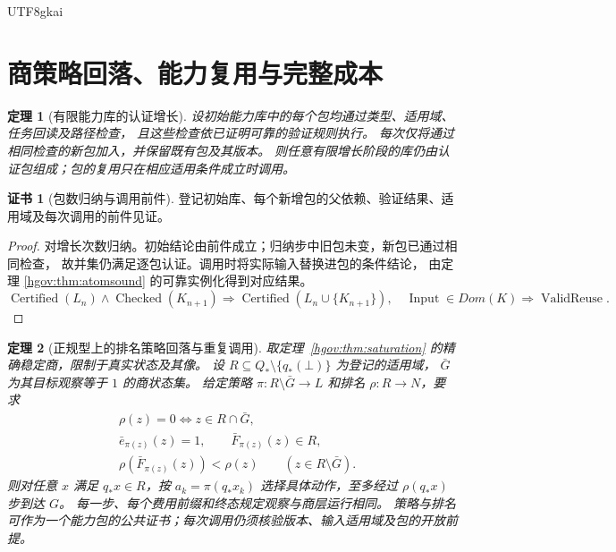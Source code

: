 \documentclass[12pt,a4paper,openany,notitlepage]{report}
\theoremstyle{plain}
\newtheorem{theorem}{定理}[chapter]
\theoremstyle{definition}
\newtheorem*{certificate}{证书}
\theoremstyle{remark}
\def\mathcal#1{#1}\def\mathsf#1{#1}\def\mathbb#1{#1}%
\begin{document}
\begin{CJK*}{UTF8}{gkai}
\section{商策略回落、能力复用与完整成本}
\label{exp:gov:reuse-section}

\begin{theorem}[有限能力库的认证增长]
\label{hgov:thm:library}
设初始能力库中的每个包均通过类型、适用域、任务回读及路径检查，
且这些检查依已证明可靠的验证规则执行。
每次仅将通过相同检查的新包加入，并保留既有包及其版本。
则任意有限增长阶段的库仍由认证包组成；包的复用只在相应适用条件成立时调用。
\end{theorem}
\begin{certificate}[包数归纳与调用前件]
登记初始库、每个新增包的父依赖、验证结果、适用域及每次调用的前件见证。
\end{certificate}
\begin{proof}
对增长次数归纳。初始结论由前件成立；归纳步中旧包未变，新包已通过相同检查，
故并集仍满足逐包认证。调用时将实际输入替换进包的条件结论，
由定理 \ref{hgov:thm:atomsound} 的可靠实例化得到对应结果。
\[
\operatorname{Certified}(\mathcal L_n)\land\operatorname{Checked}(K_{n+1})
\Rightarrow\operatorname{Certified}(\mathcal L_n\cup\{K_{n+1}\}),
\quad
\operatorname{Input}\in\mathsf{Dom}(K)\Rightarrow\operatorname{ValidReuse}.
\]
\end{proof}

\begin{theorem}[正规型上的排名策略回落与重复调用]
\label{exp:gov:policy-reuse}
取定理~\ref{hgov:thm:saturation} 的精确稳定商，限制于真实状态及其像。
设 $R\subseteq Q_*\setminus\{q_*(\bot)\}$ 为登记的适用域，
$\bar G$ 为其目标观察等于 $1$ 的商状态集。
给定策略 $\pi:R\setminus\bar G\to L$ 和排名 $\rho:R\to\mathbb N$，要求
\[
\begin{aligned}
 &\rho(z)=0\Longleftrightarrow z\in R\cap\bar G,\\
 &\bar e_{\pi(z)}(z)=1,
 \qquad \bar F_{\pi(z)}(z)\in R,\\
 &\rho(\bar F_{\pi(z)}(z))<\rho(z)
 \qquad(z\in R\setminus\bar G).
\end{aligned}
\]
则对任意 $x$ 满足 $q_*x\in R$，按
$a_k=\pi(q_*x_k)$ 选择具体动作，至多经过 $\rho(q_*x)$ 步到达 $G$。
每一步、每个费用前缀和终态规定观察与商层运行相同。
策略与排名可作为一个能力包的公共证书；每次调用仍须核验版本、输入适用域及包的开放前提。


\end{theorem}
\end{CJK*}
\end{document}
